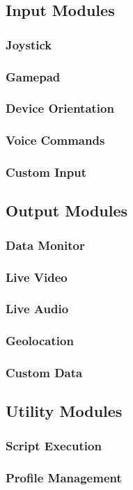 \subsection{Input Modules}
\subsubsection{Joystick} \label{joystick}
\subsubsection{Gamepad} \label{gamepad}
\subsubsection{Device Orientation} \label{deviceorientation}
\subsubsection{Voice Commands} \label{voicecommands}
\subsubsection{Custom Input} \label{custominput}
\subsection{Output Modules}
\subsubsection{Data Monitor} \label{datamonitor}
\subsubsection{Live Video} \label{livevideo}
\subsubsection{Live Audio}
\subsubsection{Geolocation}
\subsubsection{Custom Data} \label{customdata}
\subsection{Utility Modules}
\subsubsection{Script Execution} \label{scriptexecution}
\subsubsection{Profile Management} \label{profilemanagement}